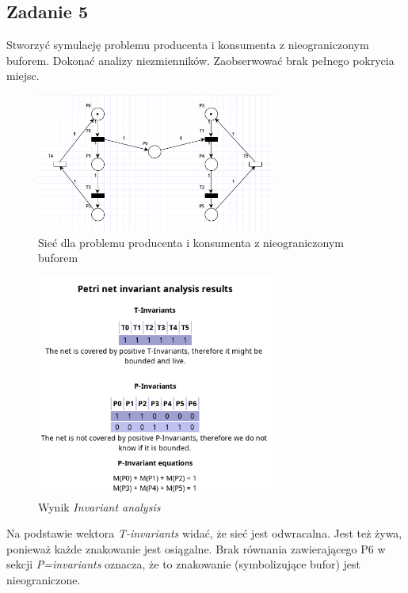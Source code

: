 \documentclass{article}
\begin{document}
\subsection{Zadanie 5}
Stworzyć symulację problemu producenta i konsumenta z nieograniczonym buforem. Dokonać analizy niezmienników.
Zaobserwować brak pełnego pokrycia miejsc.

\begin{figure}[H]
    \centering
    \includegraphics[width=0.7\textwidth]{net_5.png}
    \caption{Sieć dla problemu producenta i konsumenta z nieograniczonym buforem}
\end{figure}

\begin{figure}[H]
    \centering
    \includegraphics[width=0.7\textwidth]{invariant_5.png}
    \caption{Wynik \textit{Invariant analysis}}
\end{figure}

Na podstawie wektora \textit{T-invariants} widać, że sieć jest odwracalna.
Jest też żywa, ponieważ każde znakowanie jest osiągalne.
Brak równania zawierającego P6 w sekcji \textit{P=invariants} oznacza, że to znakowanie
(symbolizujące bufor) jest nieograniczone.
\end{document}
